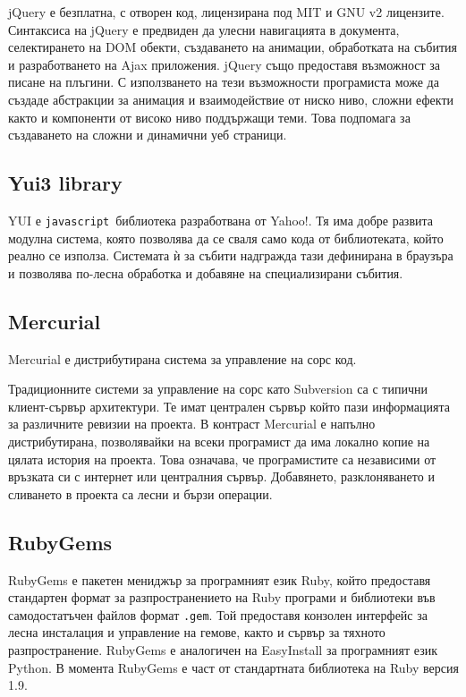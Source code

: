 \documentclass[a4paper]{article}
\def\js{\texttt{javascript}}
\begin{document}
  jQuery е безплатна, с отворен код, лицензирана под MIT и GNU v2 лицензите. Синтаксиса на jQuery е предвиден да улесни навигацията в документа, селектирането на DOM обекти, създаването на анимации, обработката на събития и разработването на Ajax приложения. jQuery също предоставя възможност за писане на плъгини. С използването на тези възможности програмиста може да създаде абстракции за анимация и взаимодействие от ниско ниво, сложни ефекти както и компоненти от високо ниво поддържащи теми. Това подпомага за създаването на сложни и динамични уеб страници.

  \subsection{Yui3 library}
  YUI \cite{yui} е \js\ библиотека разработвана от Yahoo!. Тя има добре развита модулна система, която позволява да се сваля само кода от библиотеката, който реално се използа. Системата ѝ за събити надгражда тази дефинирана в браузъра и позволява по-лесна обработка и добавяне на специализирани събития.

  \subsection{Mercurial}
  Mercurial \cite{mercurial} е дистрибутирана система за управление на сорс код.

  Традиционните системи за управление на сорс като Subversion са с типични клиент-сървър архитектури. Те имат централен сървър който пази информацията за различните ревизии на проекта. В контраст Mercurial е напълно дистрибутирана, позволявайки на всеки програмист да има локално копие на цялата история на проекта. Това означава, че програмистите са независими от връзката си с интернет или централния сървър. Добавянето, разклоняването и сливането в проекта са лесни и бързи операции.

  \subsection{RubyGems}
  RubyGems \cite{rubygems} е пакетен мениджър за програмният език Ruby, който предоставя стандартен формат за разпространението на Ruby програми и библиотеки във самодостатъчен файлов формат \texttt{.gem}. Той предоставя конзолен интерфейс за лесна инсталация и управление на гемове, както и сървър за тяхното разпространение. RubyGems е аналогичен на EasyInstall за програмният език Python. В момента RubyGems е част от стандартната библиотека на Ruby версия 1.9.
\end{document}
